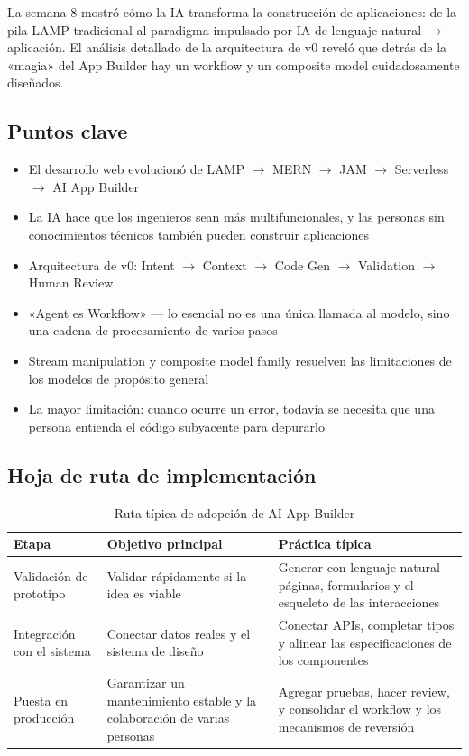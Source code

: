 \documentclass[a4paper]{article}
\begin{document}
La semana 8 mostró cómo la IA transforma la construcción de aplicaciones: de la pila LAMP tradicional al paradigma impulsado por IA de lenguaje natural $\rightarrow$ aplicación. El análisis detallado de la arquitectura de v0 reveló que detrás de la «magia» del App Builder hay un workflow y un composite model cuidadosamente diseñados.

\subsection{Puntos clave}

\begin{itemize}
    \item El desarrollo web evolucionó de LAMP $\rightarrow$ MERN $\rightarrow$ JAM $\rightarrow$ Serverless $\rightarrow$ AI App Builder
    \item La IA hace que los ingenieros sean más multifuncionales, y las personas sin conocimientos técnicos también pueden construir aplicaciones
    \item Arquitectura de v0: Intent $\rightarrow$ Context $\rightarrow$ Code Gen $\rightarrow$ Validation $\rightarrow$ Human Review
    \item «Agent es Workflow» — lo esencial no es una única llamada al modelo, sino una cadena de procesamiento de varios pasos
    \item Stream manipulation y composite model family resuelven las limitaciones de los modelos de propósito general
    \item La mayor limitación: cuando ocurre un error, todavía se necesita que una persona entienda el código subyacente para depurarlo
\end{itemize}

\subsection{Hoja de ruta de implementación}

\begin{table}[H]
\centering
\begin{tabular}{p{} p{} p{}}
\toprule
Etapa & Objetivo principal & Práctica típica \\
\midrule
Validación de prototipo & Validar rápidamente si la idea es viable & Generar con lenguaje natural páginas, formularios y el esqueleto de las interacciones \\
Integración con el sistema & Conectar datos reales y el sistema de diseño & Conectar APIs, completar tipos y alinear las especificaciones de los componentes \\
Puesta en producción & Garantizar un mantenimiento estable y la colaboración de varias personas & Agregar pruebas, hacer review, y consolidar el workflow y los mecanismos de reversión \\
\bottomrule
\end{tabular}
\caption{Ruta típica de adopción de AI App Builder}
\end{table}
\end{document}
